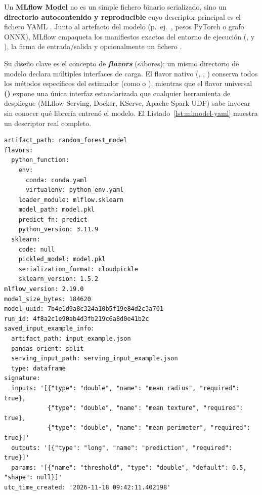 Un \textbf{MLflow Model} no es un simple fichero binario serializado, sino un \textbf{directorio autocontenido y reproducible} cuyo descriptor principal es el fichero YAML . Junto al artefacto del modelo (p.~ej.\ , pesos PyTorch o grafo ONNX), MLflow empaqueta los manifiestos exactos del entorno de ejecución (,  y ), la firma de entrada/salida y opcionalmente un fichero .

Su diseño clave es el concepto de \textbf{\textit{flavors}} (sabores): un mismo directorio de modelo declara múltiples interfaces de carga. El flavor nativo (, , ) conserva todos los métodos específicos del estimador (como  o ), mientras que el flavor universal \textbf{ ()} expone una única interfaz estandarizada  que cualquier herramienta de despliegue (MLflow Serving, Docker, KServe, Apache Spark UDF) sabe invocar sin conocer qué librería entrenó el modelo. El Listado~\ref{lst:mlmodel-yaml} muestra un descriptor  real completo.

\begin{lstlisting}[style=yaml, caption={Ejemplo real de descriptor MLmodel con dos flavors (python\_function y sklearn), firma tipada y referencia a input\_example.}, label={lst:mlmodel-yaml}]
artifact_path: random_forest_model
flavors:
  python_function:
    env:
      conda: conda.yaml
      virtualenv: python_env.yaml
    loader_module: mlflow.sklearn
    model_path: model.pkl
    predict_fn: predict
    python_version: 3.11.9
  sklearn:
    code: null
    pickled_model: model.pkl
    serialization_format: cloudpickle
    sklearn_version: 1.5.2
mlflow_version: 2.19.0
model_size_bytes: 184620
model_uuid: 7b4e1d9a8c324a10b5f19e84d2c3a701
run_id: 4f8a2c1e90ab4d3fb219c6a8d0e41b2c
saved_input_example_info:
  artifact_path: input_example.json
  pandas_orient: split
  serving_input_path: serving_input_example.json
  type: dataframe
signature:
  inputs: '[{"type": "double", "name": "mean radius", "required": true},
            {"type": "double", "name": "mean texture", "required": true},
            {"type": "double", "name": "mean perimeter", "required": true}]'
  outputs: '[{"type": "long", "name": "prediction", "required": true}]'
  params: '[{"name": "threshold", "type": "double", "default": 0.5, "shape": null}]'
utc_time_created: '2026-11-18 09:42:11.402198'
\end{lstlisting}

